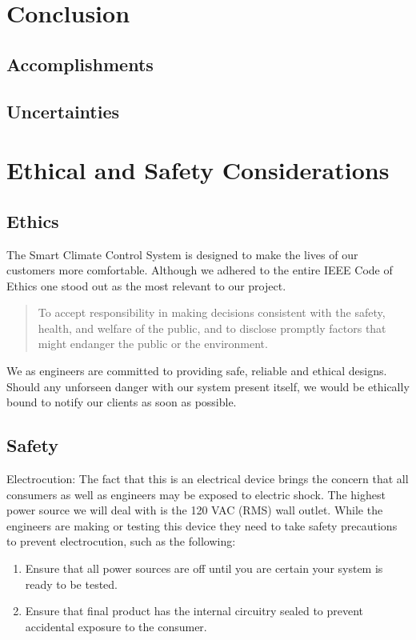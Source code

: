 \section{Conclusion}
\subsection{Accomplishments}
\subsection{Uncertainties}
\section{Ethical and Safety Considerations}
\subsection{Ethics}
The Smart Climate Control System is designed to make the lives of our customers more comfortable. Although we adhered to the entire IEEE Code of Ethics one stood out as the most relevant to our project.
\begin{quote}
To accept responsibility in making decisions consistent with the safety, health, and welfare of the public, and to disclose promptly factors that might endanger the public or the environment.
\end{quote}
We as engineers are committed to providing safe, reliable and ethical designs.  Should any unforseen danger with our system present itself, we would be ethically bound to notify our clients as soon as possible.

\subsection{Safety}
Electrocution: The fact that this is an electrical device brings the concern that all consumers as well as engineers may be exposed to electric shock. The highest power source we will deal with is the 120 VAC (RMS) wall outlet. While the engineers are making or testing this device they need to take safety precautions to prevent electrocution, such as the following:
\begin{enumerate}
\item
Ensure that all power sources are off until you are certain your system is ready to be tested.
\item
Ensure that final product has the internal circuitry sealed to prevent accidental exposure to the consumer.
\end{enumerate}

